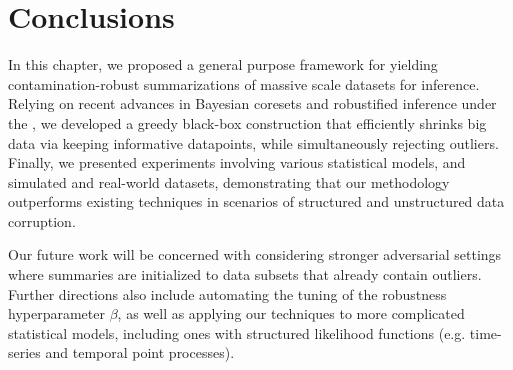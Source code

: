 \section{Conclusions}%
\label{sec:conclusion}
In this chapter, we proposed a general purpose framework for yielding  contamination-robust summarizations of massive scale datasets for inference. Relying on recent advances in Bayesian coresets and robustified inference under the \bdiv{}, we developed a greedy black-box construction that efficiently shrinks big data via keeping informative datapoints, while simultaneously rejecting outliers.
 Finally, we presented experiments involving various statistical models, and simulated and real-world datasets, demonstrating that our methodology outperforms existing techniques in scenarios of structured and unstructured data corruption. 

Our future work will be concerned with considering stronger adversarial settings where summaries are initialized to data subsets that already contain outliers. Further directions also include automating the tuning of the robustness hyperparameter $\beta$, as well as applying our techniques to more complicated statistical models, including ones with structured likelihood functions (e.g. time-series and temporal point processes).